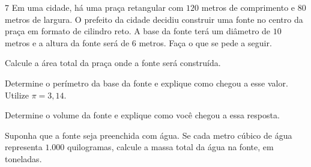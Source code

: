 {{{{\num{7} Em uma cidade, há uma praça retangular com $120$ metros de comprimento e
$80$ metros de largura. O prefeito da cidade decidiu construir uma fonte no centro
da praça em formato de cilindro reto. A base da fonte terá um diâmetro de $10$ metros
e a altura da fonte será de $6$ metros. Faça o que se pede a seguir.

\begin{escolha}
\item Calcule a área total da praça onde a fonte será construída.




\item Determine o perímetro da base da fonte e explique como chegou a esse valor.
Utilize $\pi = 3,14$.






\item Determine o volume da fonte e explique como você chegou a essa resposta.





\item Suponha que a fonte seja preenchida com água. Se cada metro cúbico de água
representa $1.000$ quilogramas, calcule a massa total da água na fonte, em toneladas.






\end{escolha}}}}}

